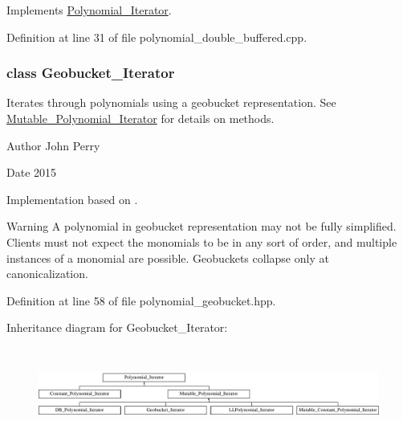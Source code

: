 Implements \hyperlink{group___iterator_group_ac571e120134088d6067718bbad513e2d}{Polynomial\+\_\+\+Iterator}.



Definition at line 31 of file polynomial\+\_\+double\+\_\+buffered.\+cpp.

\label{class_geobucket___iterator}
\subsubsection{class Geobucket\+\_\+\+Iterator}
Iterates through polynomials using a geobucket representation. See \hyperlink{group___iterator_group_class_mutable___polynomial___iterator}{Mutable\+\_\+\+Polynomial\+\_\+\+Iterator} for details on methods. 

\begin{DoxyAuthor}{Author}
John Perry 
\end{DoxyAuthor}
\begin{DoxyDate}{Date}
2015
\end{DoxyDate}
Implementation based on \cite{YanGeobuckets}. \begin{DoxyWarning}{Warning}
A polynomial in geobucket representation may not be fully simplified. Clients must not expect the monomials to be in any sort of order, and multiple instances of a monomial are possible. Geobuckets collapse only at canonicalization. 
\end{DoxyWarning}


Definition at line 58 of file polynomial\+\_\+geobucket.\+hpp.

Inheritance diagram for Geobucket\+\_\+\+Iterator\+:\begin{figure}[H]
\begin{center}
\leavevmode
\includegraphics[height=3.000000cm]{group___iterator_group}
\end{center}
\end{figure}
